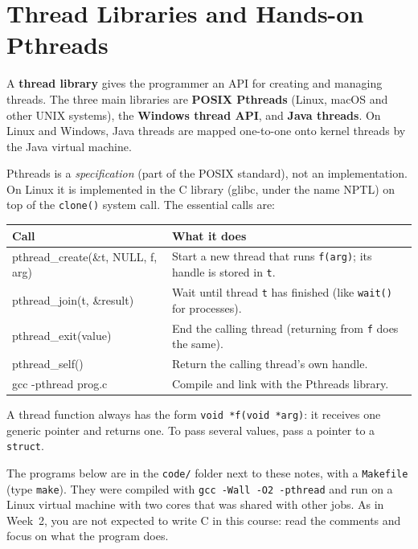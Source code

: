 \documentclass[11pt,a4paper]{article}
\newcommand{\term}[1]{\textbf{\color{mintdeep}#1}}
\newcommand{\cmd}[1]{\texttt{#1}}
\begin{document}
\section{Thread Libraries and Hands-on Pthreads}
\label{sec:handson}

A \term{thread library} gives the programmer an API for creating and managing threads. The three main libraries are \textbf{POSIX Pthreads} (Linux, macOS and other UNIX systems), the \textbf{Windows thread API}, and \textbf{Java threads}. On Linux and Windows, Java threads are mapped one-to-one onto kernel threads by the Java virtual machine.

Pthreads is a \emph{specification} (part of the POSIX standard), not an implementation. On Linux it is implemented in the C library (glibc, under the name NPTL) on top of the \cmd{clone()} system call. The essential calls are:

\begin{center}
\renewcommand{\arraystretch}{1.3}
\begin{tabularx}{\linewidth}{>{\ttfamily}l X}
\toprule
\textrm{\textbf{Call}} & \textbf{What it does} \\
\midrule
pthread\_create(\&t, NULL, f, arg) & Start a new thread that runs \cmd{f(arg)}; its handle is stored in \cmd{t}. \\
pthread\_join(t, \&result) & Wait until thread \cmd{t} has finished (like \cmd{wait()} for processes). \\
pthread\_exit(value) & End the calling thread (returning from \cmd{f} does the same). \\
pthread\_self() & Return the calling thread's own handle. \\
gcc -pthread prog.c & Compile and link with the Pthreads library. \\
\bottomrule
\end{tabularx}
\end{center}

A thread function always has the form \cmd{void *f(void *arg)}: it receives one generic pointer and returns one. To pass several values, pass a pointer to a \cmd{struct}.

The programs below are in the \texttt{code/} folder next to these notes, with a \texttt{Makefile} (type \cmd{make}). They were compiled with \cmd{gcc -Wall -O2 -pthread} and run on a Linux virtual machine with two cores that was shared with other jobs. As in Week~2, you are not expected to write C in this course: read the comments and focus on what the program does.
\end{document}
